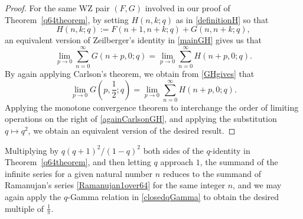 \documentclass[12pt]{article}
\begin{document}
\begin{proof}
 For the same WZ pair $(F, G)$ involved in our proof of Theorem~\ref{q64theorem}, by setting $H(n, k; q)$ as in \eqref{definitionH} so that 
\begin{equation}\label{Hwithqdefinition}
 H(n , k; q) := F(n + 1, n+ k; q) + G(n, n + k; q), 
\end{equation}
 an equivalent version of Zeilberger's identity in \eqref{mainGH} gives us that 
\begin{equation}\label{GHgives}
 \lim_{p \to 0} \sum_{n=0}^{\infty} G(n+p, 0; q) = \lim_{p \to 0} \sum_{n=0}^{\infty} 
 H(n+p,0; q). 
\end{equation}
 By again applying Carlson's theorem, we obtain from \eqref{GHgives} that 
\begin{equation}\label{againCarlsonGH}
 \lim_{p \to 0} G\left( p, \frac{1}{2}; q \right) 
 = \lim_{p \to 0} \sum_{n=0}^{\infty} H(n+p, 0; q). 
\end{equation}
 Applying the monotone convergence theorem to interchange the order of limiting operations on the right of 
 \eqref{againCarlsonGH}, and applying the substitution $q \mapsto q^2$, we obtain an equivalent version of the desired result. 
\end{proof}

 Multiplying by $ q (q+1)^2/(1-q)^2$
 both sides of the $q$-identity in Theorem~\ref{q64theorem}, 
 and then letting $q$ approach $1$, 
 the summand of the infinite series for a given natural number $n$
 reduces to the summand of Ramanujan's series 
 \eqref{Ramanujan1over64} for the same integer $n$, 
 and we may again apply the $q$-Gamma relation in \eqref{closedqGamma}
 to obtain the desired multiple of $\frac{1}{\pi}$. 
\end{document}
